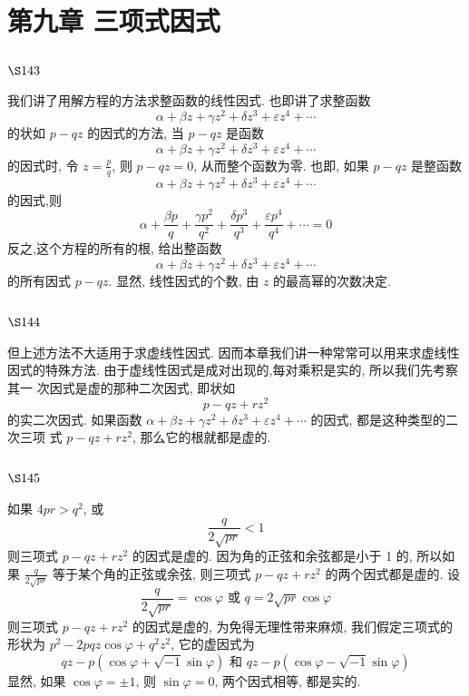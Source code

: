 \chapter{第九章 三项式因式}

\section{$\S 143$}

我们讲了用解方程的方法求整函数的线性因式. 也即讲了求整函数
\[
\alpha+\beta z+\gamma z^{2}+\delta z^{3}+\varepsilon z^{4}+\cdots
\]
的状如 $p-q z$ 的因式的方法, 当 $p-q z$ 是函数
\[
\alpha+\beta z+\gamma z^{2}+\delta z^{3}+\varepsilon z^{4}+\cdots
\]
的因式时, 令 $z=\frac{p}{q}$, 则 $p-q z=0$, 从而整个函数为零. 也即, 如果 $p-q z$ 是整函数
\[
\alpha+\beta z+\gamma z^{2}+\delta z^{3}+\varepsilon z^{4}+\cdots
\]
的因式,则
\[
\alpha+\frac{\beta p}{q}+\frac{\gamma p^{2}}{q^{2}}+\frac{\delta p^{3}}{q^{3}}+\frac{\varepsilon p^{4}}{q^{4}}+\cdots=0
\]
反之,这个方程的所有的根, 给出整函数
\[
\alpha+\beta z+\gamma z^{2}+\delta z^{3}+\varepsilon z^{4}+\cdots
\]
的所有因式 $p-q z$. 显然, 线性因式的个数, 由 $z$ 的最高幂的次数决定.

\section{$\S 144$}

但上述方法不大适用于求虚线性因式. 因而本章我们讲一种常常可以用来求虚线性 因式的特殊方法. 由于虚线性因式是成对出现的,每对乘积是实的, 所以我们先考察其一 次因式是虚的那种二次因式, 即状如
\[
p-q z+r z^{2}
\]
的实二次因式. 如果函数 $\alpha+\beta z+\gamma z^{2}+\delta z^{3}+\varepsilon z^{4}+\cdots$ 的因式, 都是这种类型的二次三项 式 $p-q z+r z^{2}$, 那么它的根就都是虚的.

\section{$\S 145$}

如果 $4 p r>q^{2}$, 或 
\[
\frac{q}{2 \sqrt{p r}}<1
\]
则三项式 $p-q z+r z^{2}$ 的因式是虚的. 因为角的正弦和余弦都是小于 1 的, 所以如果 $\frac{q}{2 \sqrt{p r}}$ 等于某个角的正弦或余弦, 则三项式 $p-q z+r z^{2}$ 的两个因式都是虚的. 设
\[
\frac{q}{2 \sqrt{p r}}=\cos \varphi \text { 或 } q=2 \sqrt{p r} \cos \varphi
\]
则三项式 $p-q z+r z^{2}$ 的因式是虚的, 为免得无理性带来麻烦, 我们假定三项式的形状为 $p^{2}-2 p q z \cos \varphi+q^{2} z^{2}$, 它的虚因式为
\[
q z-p(\cos \varphi+\sqrt{-1} \sin \varphi) \text { 和 } q z-p(\cos \varphi-\sqrt{-1} \sin \varphi)
\]
显然, 如果 $\cos \varphi=\pm 1$, 则 $\sin \varphi=0$, 两个因式相等, 都是实的.

